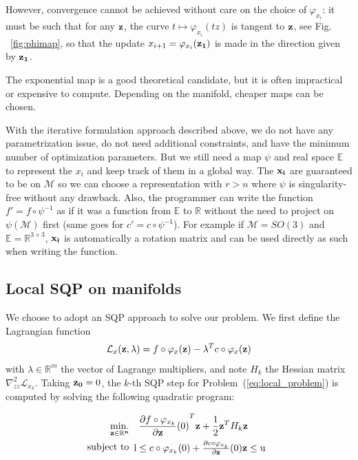 However, convergence cannot be achieved without care on the choice of $\varphi_{x_i}$: it must be such that for any ${\bf z}$, the curve $t \mapsto \varphi_{x_i}(tz)$ is tangent to ${\bf z}$, see Fig.
~\ref{fig:phimap}, so that the update $x_{i+1} = \varphi_{x_i}({\bf z_1})$ is made in the direction given by ${\bf z_1}$.

The exponential map is a good theoretical candidate, but it is often impractical or expensive to compute.
Depending on the manifold, cheaper maps can be chosen.

With the iterative formulation approach described above, we do not have any parametrization issue, do not need additional constraints, and have the minimum number of optimization parameters.
But we still need a map $\psi$ and real space $\mathbb{E}$ to represent the $x_i$ and keep track of them in a global way.
The ${\bf x_i}$ are guaranteed to be on $\mathcal{M}$ so we can choose a representation with $r>n$ where $\psi$ is singularity-free without any drawback.
Also, the programmer can write the function $f' = f \circ \psi^{-1}$ as if it was a function from $\mathbb{E}$ to $\mathbb{R}$ without the need to project on $\psi(\mathcal{M})$ first (same goes for $c' = c \circ \psi^{-1}$).
For example if $\mathcal{M} = SO(3)$ and $\mathbb{E} = \mathbb{R}^{3\times 3}$, ${\bf x_i}$ is automatically a rotation matrix and can be used directly as such when writing the function.

\subsection{Local SQP on manifolds}
We choose to adopt an SQP approach to solve our problem.
We first define the Lagrangian function
\begin{equation}
  \mathcal{L}_x ({\bf z}, \lambda) = f\circ \varphi_x({\bf z}) - \lambda^T c \circ \varphi_x({\bf z})
\end{equation}
with $\lambda \in \mathbb{R}^m$ the vector of Lagrange multipliers, and note $H_k$ the Hessian matrix $\nabla_{zz}^2 \mathcal{L}_{x_k}$.
Taking ${\bf z_0} = 0$, the $k$-th SQP step for Problem~(\ref{eq:local_problem}) is computed by solving the following quadratic program:

\begin{align}
  \label{eq:SQPStep}
  \operatorname*{min.}_{\bf z \in \mathbb{R}^n } & \quad {\frac{\partial f\circ \varphi_{x_k}}{\partial {\bf z}}(0)}^T {\bf z } + \frac{1}{2} {\bf z }^T H_k{\bf z }\\
  \text{subject to}&
  \begin{array}{lr}
    \text{l} \leq c\circ \varphi_{x_k}(0) + \frac{\partial c\circ \varphi_{x_k}}{\partial {\bf z}}(0) {\bf z }\leq \text{u}\\
  \end{array} \nonumber
\end{align}

